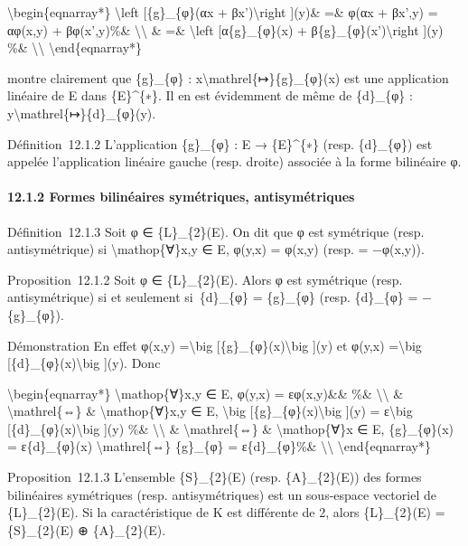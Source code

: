 \documentclass[]{article}
\begin{document}
\textbackslash{}begin\{eqnarray*\} \textbackslash{}left
{[}\{g\}\_\{φ\}(αx + βx')\textbackslash{}right {]}(y)\& =\& φ(αx +
βx',y) = αφ(x,y) + βφ(x',y)\%\& \textbackslash{}\textbackslash{} \& =\&
\textbackslash{}left {[}α\{g\}\_\{φ\}(x) +
β\{g\}\_\{φ\}(x')\textbackslash{}right {]}(y) \%\&
\textbackslash{}\textbackslash{} \textbackslash{}end\{eqnarray*\}

montre clairement que \{g\}\_\{φ\} :
x\textbackslash{}mathrel\{↦\}\{g\}\_\{φ\}(x) est une application
linéaire de E dans \{E\}\^{}\{∗\}. Il en est évidemment de même de
\{d\}\_\{φ\} : y\textbackslash{}mathrel\{↦\}\{d\}\_\{φ\}(y).

Définition~12.1.2 L'application \{g\}\_\{φ\} : E → \{E\}\^{}\{∗\} (resp.
\{d\}\_\{φ\}) est appelée l'application linéaire gauche (resp. droite)
associée à la forme bilinéaire φ.

\paragraph{12.1.2 Formes bilinéaires symétriques, antisymétriques}

Définition~12.1.3 Soit φ ∈ \{L\}\_\{2\}(E). On dit que φ est symétrique
(resp. antisymétrique) si \textbackslash{}mathop\{∀\}x,y ∈ E, φ(y,x) =
φ(x,y) (resp. = −φ(x,y)).

Proposition~12.1.2 Soit φ ∈ \{L\}\_\{2\}(E). Alors φ est symétrique
(resp. antisymétrique) si et seulement si~\{d\}\_\{φ\} = \{g\}\_\{φ\}
(resp. \{d\}\_\{φ\} = −\{g\}\_\{φ\}).

Démonstration En effet φ(x,y) =\textbackslash{}big
{[}\{g\}\_\{φ\}(x)\textbackslash{}big {]}(y) et φ(y,x)
=\textbackslash{}big {[}\{d\}\_\{φ\}(x)\textbackslash{}big {]}(y). Donc

\textbackslash{}begin\{eqnarray*\} \textbackslash{}mathop\{∀\}x,y ∈ E,
φ(y,x) = εφ(x,y)\&\& \%\& \textbackslash{}\textbackslash{} \&
\textbackslash{}mathrel\{⇔\} \& \textbackslash{}mathop\{∀\}x,y ∈ E,
\textbackslash{}big {[}\{g\}\_\{φ\}(x)\textbackslash{}big {]}(y) =
ε\textbackslash{}big {[}\{d\}\_\{φ\}(x)\textbackslash{}big {]}(y) \%\&
\textbackslash{}\textbackslash{} \& \textbackslash{}mathrel\{⇔\} \&
\textbackslash{}mathop\{∀\}x ∈ E, \{g\}\_\{φ\}(x) = ε\{d\}\_\{φ\}(x)
\textbackslash{}mathrel\{⇔\} \{g\}\_\{φ\} = ε\{d\}\_\{φ\}\%\&
\textbackslash{}\textbackslash{} \textbackslash{}end\{eqnarray*\}

Proposition~12.1.3 L'ensemble \{S\}\_\{2\}(E) (resp. \{A\}\_\{2\}(E))
des formes bilinéaires symétriques (resp. antisymétriques) est un
sous-espace vectoriel de \{L\}\_\{2\}(E). Si la caractéristique de K est
différente de 2, alors \{L\}\_\{2\}(E) = \{S\}\_\{2\}(E) ⊕
\{A\}\_\{2\}(E).
\end{document}
